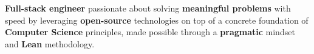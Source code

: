 
\begin{cvparagraph}
  \textbf{Full-stack engineer} passionate about solving \textbf{meaningful problems} with speed by leveraging \textbf{open-source} technologies on top of a concrete foundation of \textbf{Computer Science} principles, made possible through a \textbf{pragmatic} mindset and \textbf{Lean} methodology.
\end{cvparagraph}
